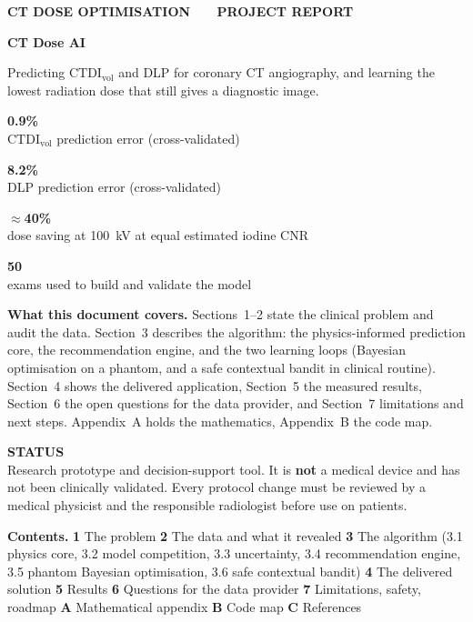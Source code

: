 \documentclass[10pt,a4paper]{article}
\newcommand{\ctdi}{\ensuremath{\mathrm{CTDI}_{\mathrm{vol}}}}
\newcommand{\kpi}[2]{%
  \begin{tcolorbox}[width=0.235\linewidth,colback=white,colframe=ctline,boxrule=0.6pt,arc=3pt,
      left=7pt,right=7pt,top=6pt,bottom=6pt,valign=top,nobeforeafter]
    {\fontsize{19}{21}\selectfont\bfseries\color{ctbluedark}#1}\\[3pt]
    {\footnotesize\color{ctink2}#2}
  \end{tcolorbox}}
\begin{document}
\thispagestyle{empty}

\vspace*{12mm}
{\footnotesize\bfseries\color{ctblue}\MakeUppercase{CT dose optimisation \ \textperiodcentered\ \ Project report}}

\vspace{4mm}
{\fontsize{30}{34}\selectfont\bfseries CT Dose AI}

\vspace{3mm}
{\large\color{ctink2} Predicting \ctdi{} and DLP for coronary CT angiography, and learning the lowest
radiation dose that still gives a diagnostic image.\par}

\vspace{7mm}
\noindent
\kpi{0.9\%}{\ctdi{} prediction error (cross-validated)}\hfill
\kpi{8.2\%}{DLP prediction error (cross-validated)}\hfill
\kpi{$\approx$40\%}{dose saving at 100~kV at equal estimated iodine CNR}\hfill
\kpi{50}{exams used to build and validate the model}

\vspace{8mm}
\noindent\textbf{What this document covers.} Sections~1--2 state the clinical problem and audit the data.
Section~3 describes the algorithm: the physics-informed prediction core, the recommendation engine, and the two
learning loops (Bayesian optimisation on a phantom, and a safe contextual bandit in clinical routine).
Section~4 shows the delivered application, Section~5 the measured results, Section~6 the open questions for the
data provider, and Section~7 limitations and next steps. Appendix~A holds the mathematics, Appendix~B the code map.

\vspace{3mm}
\begin{warnbox}
\textbf{\footnotesize\color{ctink2}\MakeUppercase{Status}}\\[2pt]
Research prototype and decision-support tool. It is \textbf{not} a medical device and has not been clinically
validated. Every protocol change must be reviewed by a medical physicist and the responsible radiologist before
use on patients.
\end{warnbox}

\vspace{4mm}
{\footnotesize\color{ctink2}
\textbf{\color{ctink}Contents.}
\textbf{1} The problem \quad
\textbf{2} The data and what it revealed \quad
\textbf{3} The algorithm (3.1 physics core, 3.2 model competition, 3.3 uncertainty,
3.4 recommendation engine, 3.5 phantom Bayesian optimisation, 3.6 safe contextual bandit) \quad
\textbf{4} The delivered solution \quad
\textbf{5} Results \quad
\textbf{6} Questions for the data provider \quad
\textbf{7} Limitations, safety, roadmap \quad
\textbf{A} Mathematical appendix \quad
\textbf{B} Code map \quad
\textbf{C} References\par}
\end{document}

